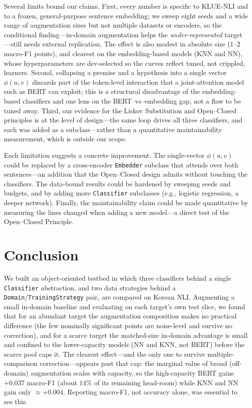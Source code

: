 \documentclass[conference]{IEEEtran}
\begin{document}
Several limits bound our claims. First, every number is specific to
KLUE-NLI and to a frozen, general-purpose sentence embedding; we sweep
eight seeds and a wide range of augmentation sizes but not multiple
datasets or encoders, so the conditional finding---in-domain augmentation
helps the \emph{under-represented} target---still needs external
replication. The effect is also modest in absolute size ($1$--$2$ macro-F1
points), and clearest on the embedding-based models (KNN and NN), whose
hyperparameters are dev-selected so the curves reflect tuned, not
crippled, learners. Second, collapsing a premise and a
hypothesis into a single vector $\phi(u,v)$ discards part of the
token-level interaction that a joint-attention model such as BERT can
exploit; this is a structural disadvantage of the embedding-based
classifiers and one lens on the BERT--vs--embedding gap, not a flaw to
be tuned away. Third, our evidence for the Liskov Substitution and
Open--Closed principles is at the level of design---the same loop drives
all three classifiers, and each was added as a subclass---rather than a
quantitative maintainability measurement, which is outside our scope.

Each limitation suggests a concrete improvement. The single-vector
$\phi(u,v)$ could be replaced by a cross-encoder \texttt{Embedder}
subclass that attends over both sentences---an addition that the
Open--Closed design admits without touching the classifiers. The
data-bound results could be hardened by sweeping seeds and budgets, and
by adding more \texttt{Classifier} subclasses (e.g., logistic regression,
a deeper network). Finally, the maintainability claim could be made
quantitative by measuring the lines changed when adding a new model---a
direct test of the Open--Closed Principle.

\section{Conclusion}
\label{sec:conclusion}

We built an object-oriented testbed in which three classifiers behind a
single \texttt{Classifier} abstraction, and two data strategies behind a
\texttt{Domain}/\texttt{TrainingStrategy} pair, are compared on Korean
NLI. Augmenting a small in-domain baseline and evaluating on each target's
own test slice, we found that for an abundant target the augmentation
composition makes no practical difference (the few nominally significant
points are noise-level and survive no correction), and for a scarce target
the matched-size in-domain advantage is small and confined to the
lower-capacity models (NN and KNN, not BERT) before the scarce pool caps
it. The clearest effect---and the only one to survive multiple-comparison
correction---appears past that cap: the marginal value of broad
(off-domain) augmentation scales with capacity, so the high-capacity BERT
gains $+0.037$ macro-F1 (about $14\%$ of its remaining head-room) while KNN
and NN gain only $\approx +0.004$. Reporting macro-F1, not accuracy alone,
was essential to see this.
\end{document}
